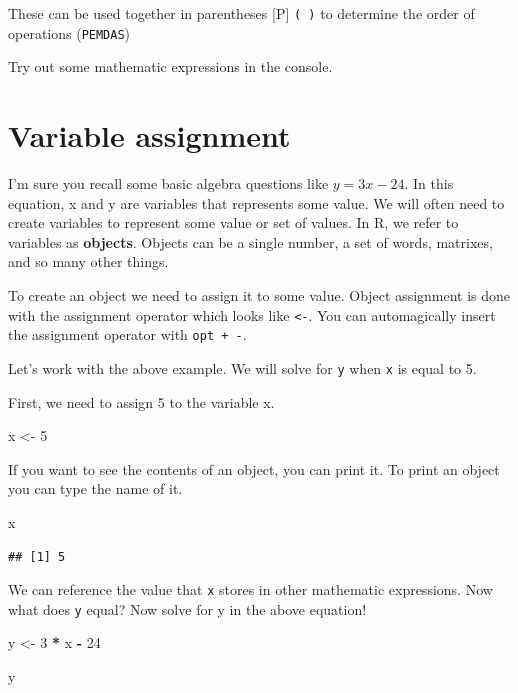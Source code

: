 \documentclass[
]{book}
\newenvironment{Shaded}{\begin{snugshade}}{\end{snugshade}}
\newcommand{\DecValTok}[1]{\textcolor[rgb]{0.00,0.00,0.81}{#1}}
\newcommand{\NormalTok}[1]{#1}
\newcommand{\OperatorTok}[1]{\textcolor[rgb]{0.81,0.36,0.00}{\textbf{#1}}}
\newcommand{\StringTok}[1]{\textcolor[rgb]{0.31,0.60,0.02}{#1}}
\begin{document}
These can be used together in parentheses {[}P{]} \texttt{(\ )} to determine the order of operations (\texttt{PEMDAS})

Try out some mathematic expressions in the console.

\hypertarget{variable-assignment}{%
\section{Variable assignment}\label{variable-assignment}}

I'm sure you recall some basic algebra questions like \(y = 3x - 24\). In this equation, x and y are variables that represents some value. We will often need to create variables to represent some value or set of values. In R, we refer to variables as \textbf{objects}. Objects can be a single number, a set of words, matrixes, and so many other things.

To create an object we need to assign it to some value. Object assignment is done with the assignment operator which looks like \texttt{\textless{}-}. You can automagically insert the assignment operator with \texttt{opt\ +\ -}.

Let's work with the above example. We will solve for \texttt{y} when \texttt{x} is equal to 5.

First, we need to assign 5 to the variable x.

\begin{Shaded}
\begin{Highlighting}[]
\NormalTok{x \textless{}{-}}\StringTok{ }\DecValTok{5}
\end{Highlighting}
\end{Shaded}

If you want to see the contents of an object, you can print it. To print an object you can type the name of it.

\begin{Shaded}
\begin{Highlighting}[]
\NormalTok{x}
\end{Highlighting}
\end{Shaded}

\begin{verbatim}
## [1] 5
\end{verbatim}

We can reference the value that \texttt{x} stores in other mathematic expressions. Now what does \texttt{y} equal? Now solve for y in the above equation!

\begin{Shaded}
\begin{Highlighting}[]
\NormalTok{y \textless{}{-}}\StringTok{ }\DecValTok{3} \OperatorTok{*}\StringTok{ }\NormalTok{x }\OperatorTok{{-}}\StringTok{ }\DecValTok{24}

\NormalTok{y}
\end{Highlighting}
\end{Shaded}
\end{document}
